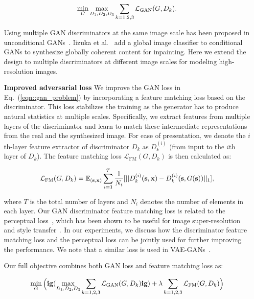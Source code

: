 \begin{equation}
\small
\min_{G} \max_{D_1,D_2,D_3} \sum_{k=1,2,3}\mathcal{L}_{\text{GAN}}(G,D_k).

\end{equation}

Using multiple GAN discriminators at the same image scale has been proposed in unconditional GANs~\cite{durugkar2016generative}. Iizuka et al.~\cite{iizuka2017globally} add a global image classifier to conditional GANs to synthesize globally coherent content for inpainting. Here we extend the design to multiple discriminators at different image scales for modeling high-resolution images. 

 {\bf Improved adversarial loss } We improve the GAN loss in Eq.~(\ref{eqn::gan_problem}) by incorporating a feature matching loss based on the discriminator. This loss stabilizes the training as the generator has to produce natural statistics at multiple scales. Specifically, we extract features from multiple layers of the discriminator and learn to match these intermediate representations from the real and the synthesized image. For ease of presentation, we denote the $i$th-layer feature extractor of discriminator $D_k$ as $D_k^{(i)}$ (from input to the $i$th layer of $D_k$). The feature matching loss $\mathcal{L}_{\text{FM}}(G,D_k)$ is then calculated as:

\begin{equation}
\small
    \mathcal{L}_{\text{FM}}(G,D_k) = \mathbb{E}_{(\mathbf{s},\mathbf{x})} \sum_{i=1}^T \frac{1}{N_i}[||D_k^{(i)}(\mathbf{s},\mathbf{x})-D_k^{(i)}(\mathbf{s},G(\mathbf{s}))||_1],
\end{equation}

where $T$ is the total number of layers and $N_i$ denotes the number of elements in each layer.  Our GAN discriminator feature matching loss is related to the perceptual loss~\cite{gatys2016image,johnson2016perceptual,dosovitskiy2016generating}, which has been shown to be useful for image super-resolution~\cite{ledig2016photo} and style transfer~\cite{johnson2016perceptual}. In our experiments, we discuss how the discriminator feature matching loss and the perceptual loss can be jointly used for further improving the performance. We note that a similar loss is used in VAE-GANs~\cite{larsen2015autoencoding}.

Our full objective combines both GAN loss and feature matching loss as:

\begin{equation}
\footnotesize
\min_{G}\bigg(\mathbf{ig}(\max_{D_1,D_2,D_3} \sum_{k=1,2,3}\mathcal{L}_{\text{GAN}}(G,D_k)\mathbf{ig}) + \lambda \sum_{k=1,2,3}\mathcal{L}_{\text{FM}}(G,D_k)\bigg)
\label{eqn::multigan}
\end{equation}

